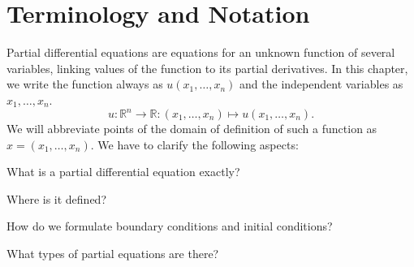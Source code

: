 %
% 
%
\chapter{Terminology and Notation}
Partial differential equations are equations for an unknown function of
several variables, linking values of the function to its partial
derivatives.
In this chapter, we write the function always as $u(x_1,\dots,x_n)$
and the independent variables as $x_1,\dots,x_n$.
\[
u\colon \mathbb R^n\to\mathbb R:(x_1,\dots,x_n)\mapsto u(x_1,\dots,x_n).
\]
We will abbreviate points of the domain of definition of such a function
as $x=(x_1,\dots,x_n)$.
We have to clarify the following aspects:
\begin{compactenum}
\item What is a partial differential equation exactly?
\item Where is it defined?
\item How do we formulate boundary conditions and initial conditions?
\item What types of partial equations are there?
\end{compactenum}








